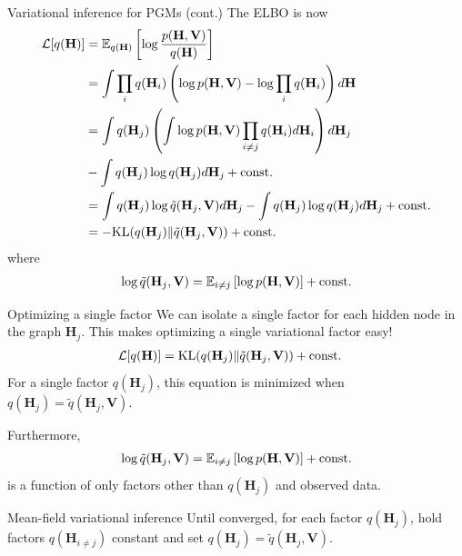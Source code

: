 \documentclass[10pt, compress]{beamer}
\begin{document}
\begin{frame}{Variational inference for PGMs (cont.)}
	The ELBO is now
	\begin{align*}
		\mathcal{L}[q(\mathbf{H})] &= \mathbb{E}_{q(\mathbf{H})} \left[\log\frac{p(\mathbf{H}, \mathbf{V})}{q(\mathbf{H})}\right] \\
											&= \int\prod_i q(\mathbf{H}_i) \left(\log p(\mathbf{H}, \mathbf{V}) - \log \prod_i q(\mathbf{H}_i)\right)d\mathbf{H}\\
											&= \int q(\mathbf{H}_j) \left(\int \log p(\mathbf{H}, \mathbf{V})\prod_{i \neq j}q(\mathbf{H}_i)d\mathbf{H}_i \right)d\mathbf{H}_j \\&- \int q(\mathbf{H}_j)\log q(\mathbf{H}_j)d \mathbf{H}_j + \textrm{const.}\\
											&= \int q(\mathbf{H}_j)\log \tilde{q}(\mathbf{H}_j, \mathbf{V})d \mathbf{H}_j- \int q(\mathbf{H}_j)\log q(\mathbf{H}_j)d \mathbf{H}_j  + \textrm{const.} \\
											&= -\textrm{KL}(q(\mathbf{H}_j)\|\tilde{q}(\mathbf{H}_j, \mathbf{V}))  + \textrm{const.}
	\end{align*}
	where 
	\begin{align*}
		\log\tilde{q}(\mathbf{H}_j, \mathbf{V}) = \mathbb{E}_{i \neq j}\left[\log p(\mathbf{H}, \mathbf{V})\right] + \textrm{const.}
	\end{align*}

\end{frame}

\begin{frame}{Optimizing a single factor}
	We can isolate a single factor for each hidden node in the graph $\mathbf{H}_j$.
	This makes optimizing a single variational factor easy!
	\pause
	\begin{align*}
		\mathcal{L}[q(\mathbf{H})] &= \textrm{KL}(q(\mathbf{H}_j)\|\tilde{q}(\mathbf{H}_j, \mathbf{V}))  + \textrm{const.}
	\end{align*}
	\pause
	For a single factor $q(\mathbf{H}_j)$, this equation is minimized
	when $q(\mathbf{H}_j) = \tilde{q}(\mathbf{H}_j, \mathbf{V})$.

	\pause
	Furthermore, 
	\begin{align*}
		\log\tilde{q}(\mathbf{H}_j, \mathbf{V}) = \mathbb{E}_{i \neq j}\left[\log p(\mathbf{H}, \mathbf{V})\right] + \textrm{const.}
	\end{align*}
	is a function of only factors other than $q(\mathbf{H}_j)$  and observed data.

	\pause
	\begin{block}{Mean-field variational inference}
		Until converged,
		for each factor $q(\mathbf{H}_j)$,
		hold factors $q(\mathbf{H}_{i \neq j})$ constant and
		set $q(\mathbf{H}_j) = \tilde{q}(\mathbf{H}_j, \mathbf{V})$.
	\end{block}
\end{frame}
\end{document}
